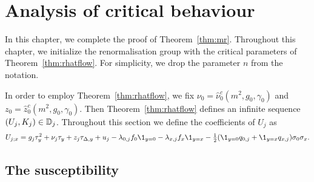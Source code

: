 \chapter{Analysis of critical behaviour}
\label{sec:chi-G-xi}

In this chapter, we complete the proof of Theorem~\ref{thm:mr}.
Throughout this chapter, we initialize the renormalisation group
with the critical parameters of Theorem~\ref{thm:rhatflow}.
For simplicity, we drop the parameter $n$ from the notation.

In order to employ Theorem~\ref{thm:rhatflow}, we fix
$\nu_0 = \hat\nu_0^c(m^2, g_0, \gamma_0)$
and $z_0 = \hat z_0^c(m^2, g_0, \gamma_0)$. Then Theorem~\ref{thm:rhatflow}
defines an infinite sequence $(U_j, K_j) \in \mathbb{D}_j$. Throughout this
section we define the coefficients of $U_j$ as
\begin{equation}
U_{j;x}
	=
g_j \tau_y^2 + \nu_j \tau_y + z_j \tau_{\Delta,y} + u_j
- \lambda_{0,j} f_0 \1_{y=0}
- \lambda_{x,j} f_x \1_{y=x}
- \tfrac12 (\1_{y=0} q_{0,j} + \1_{y=x} q_{x,j}) \sigma_0 \sigma_x.
\end{equation}



\section{The susceptibility}
\label{sec:suscept}

